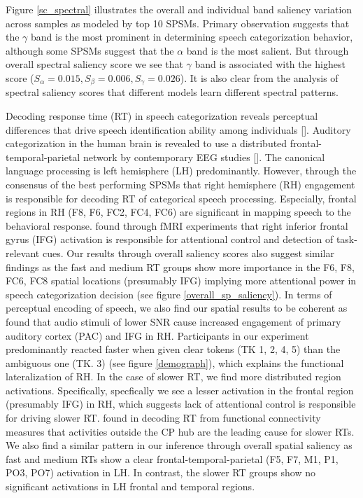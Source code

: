 \documentclass{article}
\begin{document}
Figure \ref{sc_spectral} illustrates the overall and individual band saliency variation across samples as modeled by top 10 SPSMs. Primary observation suggests that the $\gamma$ band is the most prominent in determining speech categorization behavior, although some SPSMs suggest that the $\alpha$ band is the most salient. But through overall spectral saliency score we see that $\gamma$ band is associated with the highest score ($S_\alpha = 0.015, S_\beta = 0.006, S_\gamma = 0.026$). It is also clear from the analysis of spectral saliency scores that different models learn different spectral patterns.

Decoding response time (RT) in speech categorization reveals perceptual differences that drive speech identification ability among individuals [\cite{Al_Fahad_2020}]. Auditory categorization in the human brain is revealed to use a distributed frontal-temporal-parietal network by contemporary EEG studies [\cite{plasticity_sp, language_sp, Al_Fahad_2020}]. The canonical language processing is left hemisphere (LH) predominantly. However, through the consensus of the best performing SPSMs that right hemisphere (RH) engagement is responsible for decoding RT of categorical speech processing. Especially, frontal regions in RH (F8, F6, FC2, FC4, FC6) are significant in mapping speech to the behavioral response. \cite{RH_IFG1, RH_IFG2} found through fMRI experiments that right inferior frontal gyrus (IFG) activation is responsible for attentional control and detection of task-relevant cues. Our results through overall saliency scores also suggest similar findings as the fast and medium RT groups show more importance in the F6, F8, FC6, FC8 spatial locations (presumably IFG) implying more attentional power in speech categorization decision (see figure \ref{overall_sp_saliency}). In terms of perceptual encoding of speech, we also find our spatial results to be coherent as \cite{Bidelman2016FunctionalCI} found that audio stimuli of lower SNR cause increased engagement of primary auditory cortex (PAC) and IFG in RH. Participants in our experiment predominantly reacted faster when given clear tokens (TK 1, 2, 4, 5) than the ambiguous one (TK. 3) (see figure \ref{demograph}), which explains the functional lateralization of RH. In the case of slower RT, we find more distributed region activations. Specifically, specfically we see a lesser activation in the frontal region (presumably IFG) in RH, which suggests lack of attentional control is responsible for driving slower RT. \cite{Al_Fahad_2020} found in decoding RT from functional connectivity measures that activities outside the CP hub are the leading cause for slower RTs. We also find a similar pattern in our inference through overall spatial saliency as fast and medium RTs show a clear frontal-temporal-parietal (F5, F7, M1, P1, PO3, PO7) activation in LH. In contrast, the slower RT groups show no significant activations in LH frontal and temporal regions.
\end{document}
